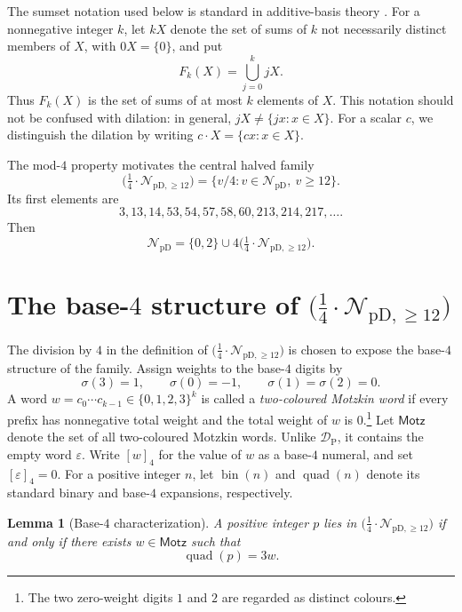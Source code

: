 \documentclass[12pt]{article}
\theoremstyle{plain}
\newtheorem{lemma}[theorem]{Lemma}
\theoremstyle{definition}
\theoremstyle{plain}
\newcommand{\NpD}{\mathcal{N}_{\mathrm{pD}}}
\newcommand{\DP}{\mathcal{D}_{\mathrm{P}}}
\newcommand{\Pset}{%
  \bigl(\tfrac{1}{4}\cdot\mathcal{N}_{\mathrm{pD},\geq 12}\bigr)%
}
\begin{document}
The sumset notation used below is standard in additive-basis theory
\cite[Chap.\ 1]{Nathanson}.  For a nonnegative integer $k$, let $kX$ denote the
set of sums of $k$ not necessarily distinct members of $X$, with
$0X=\{0\}$, and put
\[
 F_k(X)=\bigcup_{j=0}^{k}jX.
\]
Thus $F_k(X)$ is the set of sums of at most $k$ elements of $X$.  This
notation should not be confused with dilation: in general,
$jX\neq\{jx:x\in X\}$.  For a scalar $c$, we distinguish the dilation by
writing $c\cdot X=\{cx:x\in X\}$.

The mod-$4$ property motivates the central halved family
\begin{equation}\label{eq:P-def}
 \Pset=\{v/4:v\in\NpD,\ v\geq12\}.
\end{equation}
Its first elements are
\[
 3,13,14,53,54,57,58,60,213,214,217,\ldots.
\]
Then
\begin{equation}\label{eq:NpD-decomp}
 \NpD=\{0,2\}\cup4\Pset.
\end{equation}


\section{The base-\texorpdfstring{$4$}{4} structure of
\texorpdfstring{$\Pset$}{P}}\label{sec:base4}

The division by $4$ in the definition of $\Pset$ is chosen to expose the
base-$4$ structure of the family.  Assign weights to the base-$4$ digits by
\[
  \sigma(3)=1,\qquad \sigma(0)=-1,\qquad
  \sigma(1)=\sigma(2)=0.
\]
A word $w=c_0\cdots c_{k-1}\in\{0,1,2,3\}^{k}$ is called a
\emph{two-coloured Motzkin word} if every prefix has nonnegative total weight
and the total weight of $w$ is $0$.\footnote{The two zero-weight digits $1$
and $2$ are regarded as distinct colours.}  Let $\mathsf{Motz}$ denote the
set of all two-coloured Motzkin words.  Unlike $\DP$, it contains the empty
word $\varepsilon$.  Write $[w]_4$ for the value of $w$ as a base-$4$
numeral, and set $[\varepsilon]_4=0$.  For a positive integer $n$, let
$\operatorname{bin}(n)$ and $\operatorname{quad}(n)$ denote its standard
binary and base-$4$ expansions, respectively.

\begin{lemma}[Base-$4$ characterization]\label{lem:base4}
A positive integer $p$ lies in $\Pset$ if and only if there exists
$w\in\mathsf{Motz}$ such that
\[
 \operatorname{quad}(p)=3w.
\]
\end{lemma}
\end{document}

